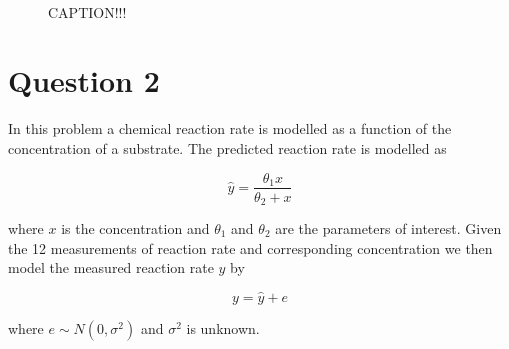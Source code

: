 \begin{figure}
    \mbox{\vspace{5mm}}
    \mbox{   \quad 
            }
    \caption{CAPTION!!!}
    \label{fig:ex13}
\end{figure}


\section*{Question 2}

In this problem a chemical reaction rate is modelled as a function of the concentration of a substrate. The predicted reaction rate is modelled as

\begin{equation*}
    \hat{y} = \frac{\theta_1 x}{\theta_2 + x}
\end{equation*}

where $x$ is the concentration and $\theta_1$ and $\theta_2$ are the parameters of interest. Given the 12 measurements of reaction rate and corresponding concentration we then model the measured reaction rate $y$ by

\begin{equation*}
    y = \hat{y} + e
\end{equation*}

where $e\sim N(0,\sigma^2)$ and $\sigma^2$ is unknown.

